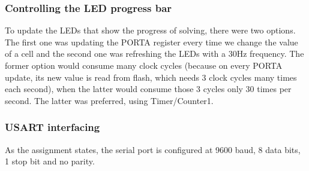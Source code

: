 \documentclass[12pt, a4, hidelinks]{article}
\begin{document}
\begin{algorithm}[H]
\DontPrintSemicolon


	\;

	\;

\end{algorithm}

\subsubsection*{Controlling the LED progress bar}
To update the LEDs that show the progress of solving, there were two options. The first one was updating the PORTA register every time we change the value of a cell and the second one was refreshing the LEDs with a 30Hz frequency. The former option would consume many clock cycles (because on every PORTA update, its new value is read from flash, which needs 3 clock cycles many times each second), when the latter would consume those 3 cycles only 30 times per second. The latter was preferred, using Timer/Counter1.

\subsubsection*{USART interfacing}
As the assignment states, the serial port is configured at 9600 baud, 8 data bits, 1 stop bit and no parity.
\end{document}
